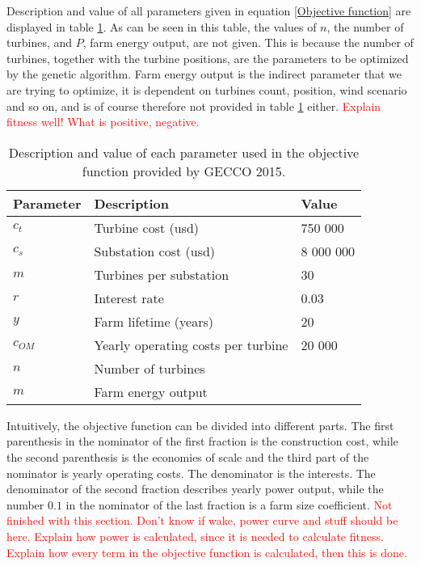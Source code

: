\noindent Description and value of all parameters given in equation \ref{Objective function} are displayed in table \ref{Parameters}. As can be seen in this table, the values of $n$, the number of turbines, and $P$, farm energy output, are not given. This is because the number of turbines, together with the turbine positions, are the parameters to be optimized by the genetic algorithm. Farm energy output is the indirect parameter that we are trying to optimize, it is dependent on turbines count, position, wind scenario and so on, and is of course therefore not provided in table \ref{Parameters} either. \textcolor{red}{Explain fitness well! What is positive, negative.}\\


\begin{table}[h!]
\begin{center}
\caption{Description and value of each parameter used in the objective function provided by GECCO 2015.}
\label{Parameters}
\begin{tabular}{l|l|l}
\textbf{Parameter} & \textbf{Description} & \textbf{Value} \\ 
\hline 
$c_t$ & Turbine cost (usd) & 750 000 \\ 
$c_s$ & Substation cost (usd) & 8 000 000 \\ 
$m$ & Turbines per substation & 30 \\ 
$r$ & Interest rate & 0.03 \\ 
$y$ & Farm lifetime (years) & 20 \\ 
$c_{OM}$ & Yearly operating costs per turbine & 20 000 \\ 
$n$ & Number of turbines &  \\ 
$m$ & Farm energy output &  \\  
\end{tabular} 
\end{center}
\end{table}


\noindent Intuitively, the objective function can be divided into different parts. The first parenthesis in the nominator of the first fraction is the construction cost, while the second parenthesis is the economies of scale and the third part of the nominator is yearly operating costs. The denominator is the interests. The denominator of the second fraction describes yearly power output, while the number $0.1$ in the nominator of the last fraction is a farm size coefficient. \textcolor{red}{Not finished with this section. Don't know if wake, power curve and stuff should be here. Explain how power is calculated, since it is needed to calculate fitness.} \textcolor{red}{Explain how every term in the objective function is calculated, then this is done.}\\



